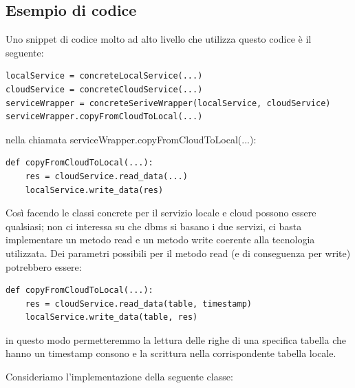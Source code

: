 \documentclass[a4paper]{article}
\begin{document}
\subsection{Esempio di codice}

Uno snippet di codice molto ad alto livello che utilizza questo codice è il seguente:
\begin{lstlisting}
localService = concreteLocalService(...)
cloudService = concreteCloudService(...)
serviceWrapper = concreteSeriveWrapper(localService, cloudService)
serviceWrapper.copyFromCloudToLocal(...)
\end{lstlisting}
nella chiamata serviceWrapper.copyFromCloudToLocal(...):
\begin{lstlisting}
def copyFromCloudToLocal(...):
    res = cloudService.read_data(...)
    localService.write_data(res)
\end{lstlisting}
Così facendo le classi concrete per il servizio locale e cloud possono essere qualsiasi; non ci interessa su che dbms si basano i due servizi, ci basta
implementare un metodo read e un metodo write coerente alla tecnologia utilizzata. Dei parametri possibili per il metodo read (e di conseguenza per write) potrebbero essere:
\begin{lstlisting}
def copyFromCloudToLocal(...):
    res = cloudService.read_data(table, timestamp)
    localService.write_data(table, res)
\end{lstlisting}
in questo modo permetteremmo la lettura delle righe di una specifica tabella che hanno un timestamp consono e la scrittura
nella corrispondente tabella locale.

Consideriamo l'implementazione della seguente classe:
\newpage
\end{document}

